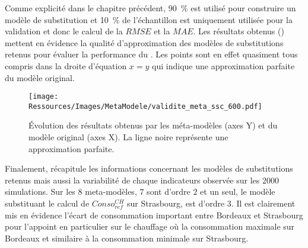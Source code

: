 Comme explicité dans le chapitre précédent,  \SI{90}{\percent} est utilisé pour construire un
modèle de substitution et \SI{10}{\percent} de l’échantillon est uniquement
utilisée pour la validation et donc le calcul de la $RMSE$ et la $MAE$.
Les résultats obtenus () mettent en évidence
la qualité d’approximation des modèles de substitutions retenus pour évaluer la
performance du . Les points sont en effet quasiment tous compris dans la
droite d’équation $x = y$ qui indique une approximation parfaite du modèle original.

\begin{figure}
    \centering
    \texttt{[image: Ressources/Images/MetaModele/validite\_meta\_ssc\_600.pdf]}
    \caption[Évaluation de la précision des méta-modèles pour les solutions de l’échantillon]
            {Évolution des résultats obtenus par les méta-modèles (axes Y) et du modèle
             original (axes X). La ligne noire représente une approximation parfaite.}
    \label{fig:validite_meta_ssc}
\end{figure}

Finalement,  récapitule les informations concernant les modèles
de substitutions retenus mais aussi la variabilité de chaque indicateurs observée sur les
$2000$ simulations. Sur les $8$ meta-modèles, $7$ sont d’ordre $2$ et un seul, le modèle
substituant le calcul de $Conso_{ref}^{CH}$ sur Strasbourg, est d’ordre $3$. Il est
clairement mis en évidence l’écart de consommation important entre Bordeaux et Strasbourg
pour l’appoint en particulier sur le chauffage où la consommation maximale sur Bordeaux et
similaire à la consommation minimale sur Strasbourg.

